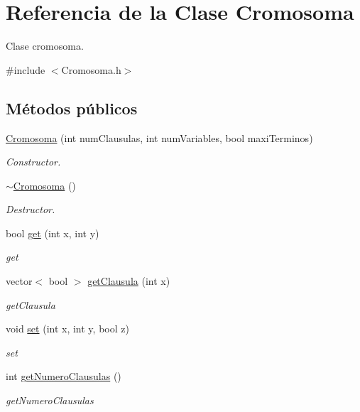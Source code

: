 \hypertarget{classCromosoma}{\section{Referencia de la Clase Cromosoma}
\label{classCromosoma}
}


Clase cromosoma.  




{\ttfamily \#include $<$Cromosoma.\-h$>$}

\subsection*{Métodos públicos}
\begin{DoxyCompactItemize}
\item 
\hyperlink{classCromosoma_a8fca0c1bd72c65aac6c2f26494e2c5f9}{Cromosoma} (int num\-Clausulas, int num\-Variables, bool maxi\-Terminos)
\begin{DoxyCompactList}\small\item\em Constructor. \end{DoxyCompactList}\item 
\hyperlink{classCromosoma_a39310d043c187768ba83a1a9c921e966}{$\sim$\-Cromosoma} ()
\begin{DoxyCompactList}\small\item\em Destructor. \end{DoxyCompactList}\item 
bool \hyperlink{classCromosoma_a59d6a42685e8b6e983b496d8051e4168}{get} (int x, int y)
\begin{DoxyCompactList}\small\item\em get \end{DoxyCompactList}\item 
vector$<$ bool $>$ \hyperlink{classCromosoma_a400e7970b9e2d9995cbc6b1f4335fd51}{get\-Clausula} (int x)
\begin{DoxyCompactList}\small\item\em get\-Clausula \end{DoxyCompactList}\item 
void \hyperlink{classCromosoma_aaf002d2f7f9438e74eeba52892868e83}{set} (int x, int y, bool z)
\begin{DoxyCompactList}\small\item\em set \end{DoxyCompactList}\item 
int \hyperlink{classCromosoma_a53e4a3cda8f7a0b2233f0219579f7cc3}{get\-Numero\-Clausulas} ()
\begin{DoxyCompactList}\small\item\em get\-Numero\-Clausulas \end{DoxyCompactList}\item 

\end{DoxyCompactItemize}
